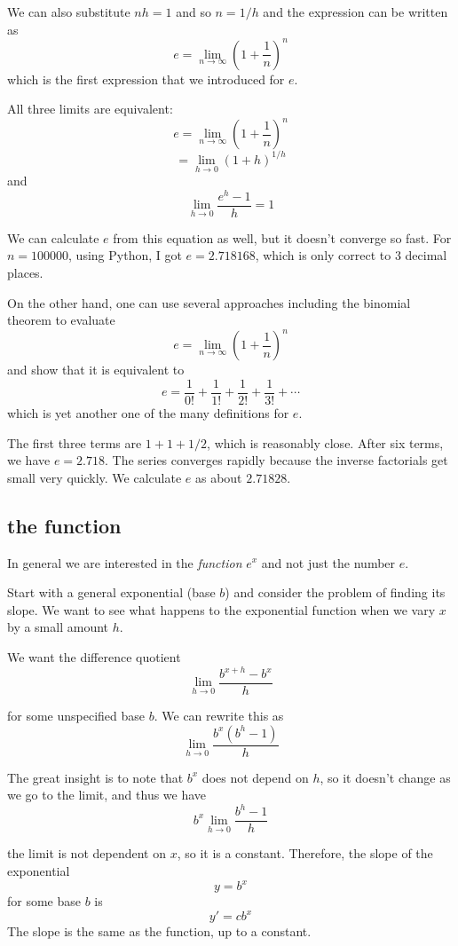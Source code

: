 \documentclass[11pt, oneside]{article}
\begin{document}
We can also substitute $nh = 1$ and so $n = 1/h$ and the expression can be written as
\[ e = \lim_{n \rightarrow \infty}  (1 + \frac{1}{n})^{n} \]
which is the first expression that we introduced for $e$.

All three limits are equivalent:
\[  e = \lim_{n \rightarrow \infty}  (1 + \frac{1}{n})^{n} \]
\[ =  \lim_{h \rightarrow 0} (1 + h)^{1/h} \]
and
\[  \lim_{h \rightarrow 0} \frac{e^{h}-1}{h} = 1 \]

We can calculate $e$ from this equation as well, but it doesn't converge so fast.  For $n=100000$, using Python, I got $e = 2.718168$, which is only correct to 3 decimal places.

On the other hand, one can use several approaches including the binomial theorem to evaluate 
\[ e = \lim_{n \rightarrow \infty} (1 + \frac{1}{n})^{n} \]
and show that it is equivalent to
\[ e = \frac{1}{0!} + \frac{1}{1!} + \frac{1}{2!} + \frac{1}{3!} + \cdots  \]
which is yet another one of the many definitions for $e$.

The first three terms are $1 + 1 + 1/2$, which is reasonably close. After six terms, we have $e = 2.718$.  The series converges rapidly because the inverse factorials get small very quickly.
We calculate $e$ as about $2.71828$.

\subsection*{the function}
In general we are interested in the \emph{function} $e^x$ and not just the number $e$.  

Start with a general exponential (base $b$) and consider the problem of finding its slope.  We want to see what happens to the exponential function when we vary $x$ by a small amount $h$.  

We want the difference quotient
\[ \lim_{h \rightarrow 0} \frac{b^{x+h} - b^x}{h} \]

for some unspecified base $b$.  We can rewrite this as
\[ \lim_{h \rightarrow 0} \frac{b^{x}(b^{h}-1)}{h} \]

The great insight is to note that $b^x$ does not depend on $h$, so it doesn't change as we go to the limit, and thus we have
\[ b^x \lim_{h \rightarrow 0} \frac{b^{h}-1}{h} \]

the limit is not dependent on $x$, so it is a constant.  Therefore, the slope of the exponential
\[ y = b^x \]
for some base $b$ is
\[ y' = cb^x \]
The slope is the same as the function, up to a constant.  
\end{document}

